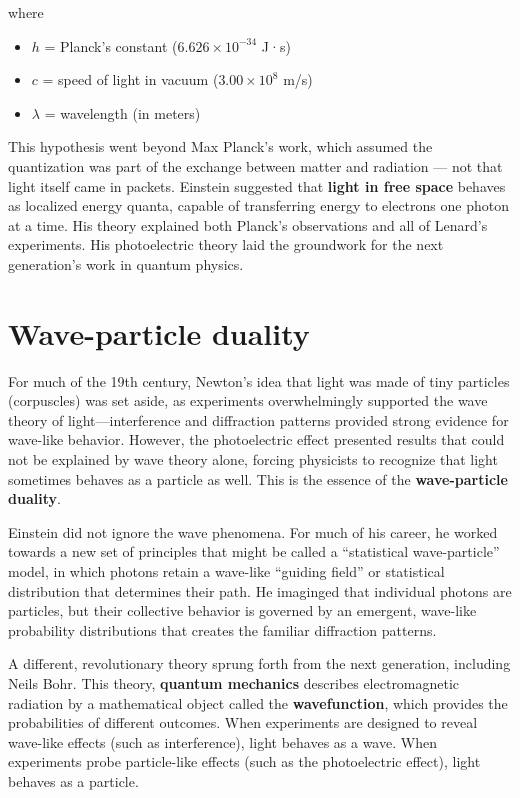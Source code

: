\documentclass[
  letterpaper,
]{book}
\providecommand{\tightlist}{%
  \setlength{\itemsep}{0pt}\setlength{\parskip}{0pt}}\usepackage{longtable,booktabs,array}
\begin{document}
where

\begin{itemize}
\tightlist
\item
  \(h\) = Planck's constant (\(6.626 \times 10^{-34}\) J·s)
\item
  \(c\) = speed of light in vacuum (\(3.00 \times 10^8\) m/s)
\item
  \(\lambda\) = wavelength (in meters)
\end{itemize}

This hypothesis went beyond Max Planck's work, which assumed the
quantization was part of the exchange between matter and radiation ---
not that light itself came in packets. Einstein suggested that
\textbf{light in free space} behaves as localized energy quanta, capable
of transferring energy to electrons one photon at a time. His theory
explained both Planck's observations and all of Lenard's experiments.
His photoelectric theory laid the groundwork for the next generation's
work in quantum physics.

\section{Wave-particle duality}\label{wave-particle-duality}

For much of the 19th century, Newton's idea that light was made of tiny
particles (corpuscles) was set aside, as experiments overwhelmingly
supported the wave theory of light---interference and diffraction
patterns provided strong evidence for wave-like behavior. However, the
photoelectric effect presented results that could not be explained by
wave theory alone, forcing physicists to recognize that light sometimes
behaves as a particle as well. This is the essence of the
\textbf{wave-particle duality}.

Einstein did not ignore the wave phenomena. For much of his career, he
worked towards a new set of principles that might be called a
``statistical wave-particle'' model, in which photons retain a wave-like
``guiding field'' or statistical distribution that determines their
path. He imaginged that individual photons are particles, but their
collective behavior is governed by an emergent, wave-like probability
distributions that creates the familiar diffraction patterns.

A different, revolutionary theory sprung forth from the next generation,
including Neils Bohr. This theory, \textbf{quantum mechanics} describes
electromagnetic radiation by a mathematical object called the
\textbf{wavefunction}, which provides the probabilities of different
outcomes. When experiments are designed to reveal wave-like effects
(such as interference), light behaves as a wave. When experiments probe
particle-like effects (such as the photoelectric effect), light behaves
as a particle.
\end{document}
